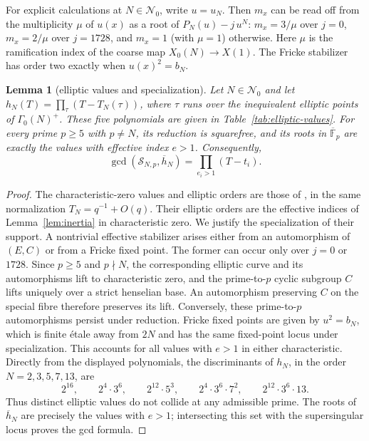 \documentclass[11pt,a4paper]{article}
\numberwithin{equation}{section}
\newtheorem{lemma}[theorem]{Lemma}
\theoremstyle{definition}
\theoremstyle{remark}
\newcommand{\Fb}{\overline{\mathbb F}_p}
\begin{document}
For explicit calculations at $N\in\mathcal N_0$, write $u=u_N$.
Then $m_x$ can be read off from the multiplicity $\mu$ of $u(x)$ as a root of
$P_N(u)-j\,u^N$: $m_x=3/\mu$ over $j=0$, $m_x=2/\mu$ over $j=1728$, and $m_x=1$ (with $\mu=1$) otherwise.
Here $\mu$ is the ramification index of the coarse map $X_0(N)\to X(1)$.
The Fricke stabilizer has order two exactly when $u(x)^2=b_N$.

\begin{lemma}[elliptic values and specialization]\label{lem:elliptic-specialization}
Let $N\in\mathcal N_0$ and let
$h_N(T)=\prod_{\tau}(T-T_N(\tau))$, where $\tau$ runs over the
inequivalent elliptic points of $\Gamma_0(N)^+$.
These five polynomials are given in Table~\ref{tab:elliptic-values}.
For every prime $p\ge5$ with $p\ne N$, its reduction is squarefree, and
its roots in $\Fb$ are exactly the values with effective index $e>1$.
Consequently,
\[
\gcd(\mathcal S_{N,p},\overline h_N)=\prod_{e_i>1}(T-t_i).
\]
\end{lemma}
\begin{proof}
The characteristic-zero values and elliptic orders are those of
\citet[\S4.2, Table~1 and Appendix~C]{JST19}, in the same normalization
$T_N=q^{-1}+O(q)$. Their elliptic orders are the effective indices of
Lemma~\ref{lem:inertia} in characteristic zero.
We justify the specialization of their support. A nontrivial effective
stabilizer arises either from an automorphism of $(E,C)$ or from a Fricke
fixed point. The former can occur only over $j=0$ or $1728$. Since
$p\ge5$ and $p\nmid N$, the corresponding elliptic curve and its
automorphisms lift to characteristic zero, and the prime-to-$p$ cyclic
subgroup $C$ lifts uniquely over a strict henselian base. An automorphism
preserving $C$ on the special fibre therefore preserves its lift.
Conversely, these prime-to-$p$ automorphisms persist under reduction.
Fricke fixed points are given by $u^2=b_N$, which is finite \'etale away
from $2N$ and has the same fixed-point locus under specialization.
This accounts for all values with $e>1$ in either characteristic.
Directly from the displayed polynomials, the discriminants of $h_N$, in
the order $N=2,3,5,7,13$, are
\[
2^{16},\qquad 2^4\cdot3^6,\qquad 2^{12}\cdot5^3,\qquad
2^4\cdot3^6\cdot7^2,\qquad 2^{12}\cdot3^6\cdot13.
\]
Thus distinct elliptic values do not collide at any admissible prime.
The roots of $\overline h_N$ are precisely the values with $e>1$;
intersecting this set with the supersingular locus proves the gcd formula.
\end{proof}
\end{document}

